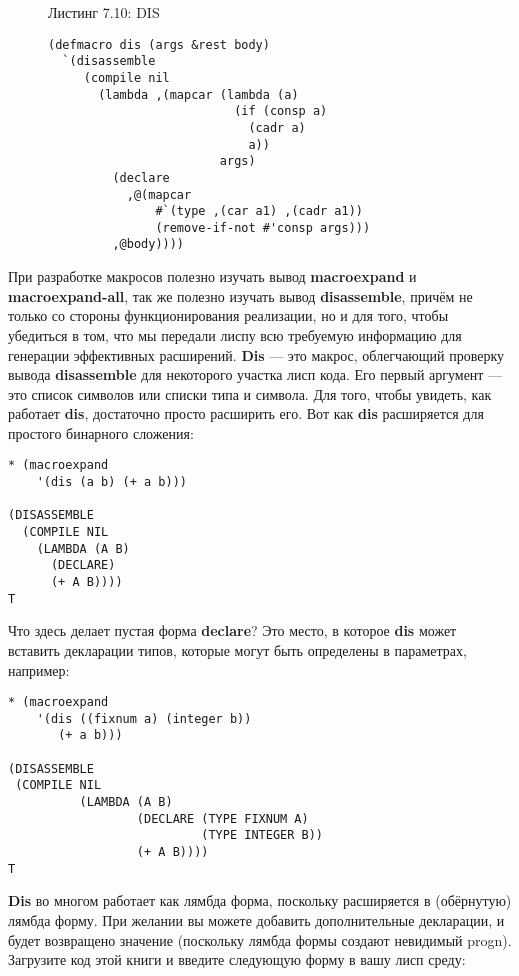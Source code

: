 \begin{figure}Листинг 7.10: DIS\label{listing_7.10}
\listbegin
\begin{verbatim}
(defmacro dis (args &rest body)
  `(disassemble
     (compile nil
       (lambda ,(mapcar (lambda (a)
                          (if (consp a)
                            (cadr a)
                            a))
                        args)
         (declare
           ,@(mapcar
               #`(type ,(car a1) ,(cadr a1))
               (remove-if-not #'consp args)))
         ,@body))))
\end{verbatim}
\listend
\end{figure}

При разработке макросов полезно изучать вывод \textbf{macroexpand} и \textbf{macroexpand-all}, так же полезно изучать вывод \textbf{disassemble}, причём не только со стороны функционирования реализации, но и для того, чтобы убедиться в том, что мы передали лиспу всю требуемую информацию для генерации эффективных расширений. \textbf{Dis} --- это макрос, облегчающий проверку вывода \textbf{disassemble} для некоторого участка лисп кода. Его первый аргумент --- это список символов или списки типа и символа. Для того, чтобы увидеть, как работает \textbf{dis}, достаточно просто расширить его. Вот как \textbf{dis} расширяется для простого бинарного сложения:

\begin{verbatim}
* (macroexpand
    '(dis (a b) (+ a b)))

(DISASSEMBLE
  (COMPILE NIL
    (LAMBDA (A B)
      (DECLARE)
      (+ A B))))
T
\end{verbatim}

Что здесь делает пустая форма \textbf{declare}? Это место, в которое \textbf{dis} может вставить декларации типов, которые могут быть определены в параметрах, например:

\begin{verbatim}
* (macroexpand
    '(dis ((fixnum a) (integer b))
       (+ a b)))

(DISASSEMBLE
 (COMPILE NIL
          (LAMBDA (A B)
                  (DECLARE (TYPE FIXNUM A)
                           (TYPE INTEGER B))
                  (+ A B))))
T
\end{verbatim}

\textbf{Dis} во многом работает как лямбда форма, поскольку расширяется в (обёрнутую) лямбда форму. При желании вы можете добавить дополнительные декларации, и будет возвращено значение (поскольку лямбда формы создают невидимый progn). Загрузите код этой книги и введите следующую форму в вашу лисп среду:

